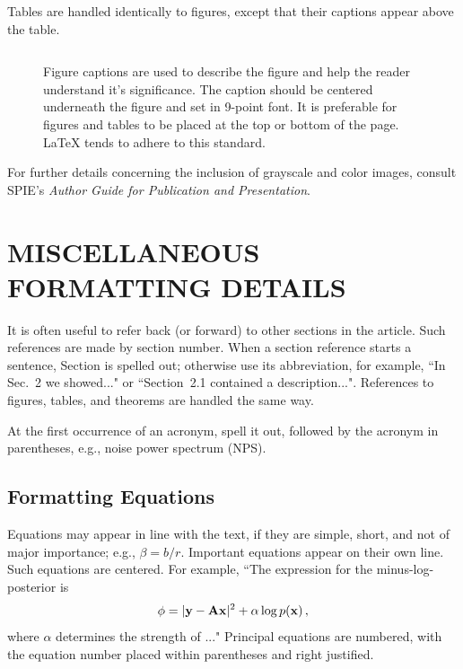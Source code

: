\documentclass[a4paper]{spie}  %
\begin{document}
Tables are handled identically to figures, except that their captions appear above the table. 
   \begin{figure}
   \begin{center}
   \begin{tabular}{c}
   \end{tabular}
   \end{center}
   \caption[example] 
   { \label{fig:example} 
Figure captions are used to describe the figure and help the reader understand it's significance.  The caption should be centered underneath the figure and set in 9-point font.  It is preferable for figures and tables to be placed at the top or bottom of the page. LaTeX tends to adhere to this standard.}
   \end{figure} 

For further details concerning the inclusion of grayscale and color images, consult SPIE's {\it Author Guide for Publication and Presentation}.
 
\appendix    %
\section{MISCELLANEOUS FORMATTING DETAILS} \label{sec:misc}

It is often useful to refer back (or forward) to other sections in the article.  Such references are made by section number.  When a section reference starts a sentence, Section is spelled out; otherwise use its abbreviation, for example, ``In Sec.~2 we showed..." or ``Section~2.1 contained a description...".  References to figures, tables, and theorems are handled the same way.

At the first occurrence of an acronym, spell it out, followed by the acronym in parentheses, e.g., noise power spectrum (NPS).  
 
\subsection{Formatting Equations} 
Equations may appear in line with the text, if they are simple, short, and not of major importance; e.g., $\beta = b/r$.  Important equations appear on their own line.  Such equations are centered.  For example, ``The expression for the minus-log-posterior is
	\begin{equation}
	\label{eq:alpha}
\phi = |{\rm\bf y} - {\rm\bf A}{\rm\bf x}|^2 + \alpha \log p({\rm\bf x}) \, ,
	\end{equation}
where $\alpha$ determines the strength of ..."  Principal equations are numbered, with the equation number placed within parentheses and right justified.  
\end{document}
